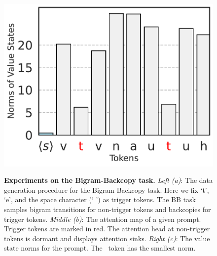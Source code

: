 \begin{figure}[t]
\begin{minipage}{0.27\textwidth}
      \label{fig:bbm-value}
      \vspace{-.2em}
      \includegraphics[width=\linewidth]{Figures/BBM/value_states_white.pdf}
  \end{minipage}
  \caption{\small \textbf{Experiments on the Bigram-Backcopy task.} 
  \textit{Left (a)}: The data generation procedure for the Bigram-Backcopy task. Here we fix `t', `e', and the space character (` ') as trigger tokens. The BB task samples bigram transitions for non-trigger tokens and backcopies for trigger tokens.  \textit{Middle (b)}: The attention map of a given prompt. Trigger tokens are marked in red. The attention head at non-trigger tokens is dormant and displays attention sinks.  \textit{Right (c)}: The value state norms for the prompt. The \bos~token has the smallest norm. 
  }
  \label{figure:pretraining-findings}
  \vspace{-1em}
\end{figure}

